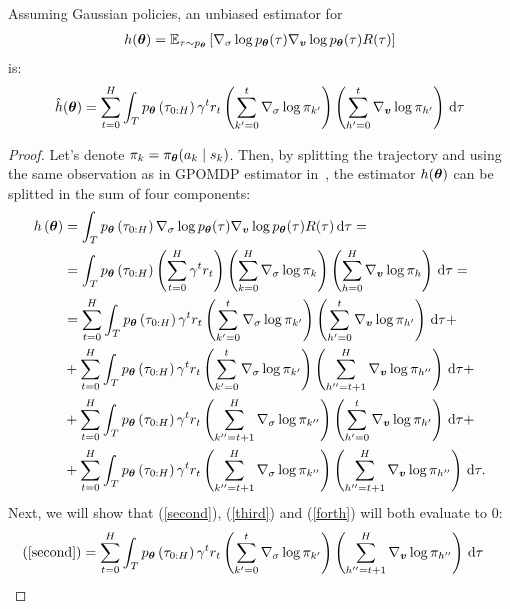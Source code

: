 \begin{theorem}
Assuming Gaussian policies, an unbiased estimator for 
\begin{align}
h(\vtheta) = \EV[\tau\sim p_{\vtheta}]{\score{\sigma}\score{\vv}R(\tau)}
\end{align}
is:
\begin{equation}
\hat{h}(\vtheta) =  \sum_{t=0}^{H}\int_{T}p_{\vtheta}\left(\tau_{0:H}\right)\gamma^{t}r_{t}\left(\gradlogsumpi{k'}{0}{t}{\sigma} \right)\left(\gradlogsumpi{h'}{0}{t}{\vv} \right)\de\tau
\end{equation}
\end{theorem}
\begin{proof}
Let's denote $\pi_k = \pi_{\vtheta}(a_k \mid s_k)$. Then, by splitting the trajectory and using the same observation as in GPOMDP estimator in~\cite{peters}, the estimator $h(\vtheta)$ can be splitted in the sum of four components:
\begin{align}
h\left({\vtheta}\right) &= \int_T p_{\vtheta}\left(\tau_{0:H}\right)\score[\vtheta]{\sigma} \score[\vtheta]{\vv}R(\tau)\de\tau \notag
= \\&=
\int_{T}p_{\vtheta}\left(\tau_{0:H}\right)\left(\sum_{t=0}^{H}\gamma^{t}r_t\right)\left(\gradlogsumpi{k}{0}{H}{\sigma}\right)\left(\gradlogsumpi{h}{0}{H}{\vv}\right) \de\tau \notag 
=\\&=
 \sum_{t=0}^{H}\int_{T}p_{\vtheta}\left(\tau_{0:H}\right)\gamma^{t}r_{t}\left(\gradlogsumpi{k'}{0}{t}{\sigma} \right)\left(\gradlogsumpi{h'}{0}{t}{\vv} \right)\de\tau  \label{first} 
+\\&+ 
\sum_{t=0}^{H}\int_{T}p_{\vtheta}\left(\tau_{0:H}\right)\gamma^{t}r_{t}\left(\gradlogsumpi{k'}{0}{t}{\sigma} \right)\left(\gradlogsumpi{h''}{t+1}{H}{\vv} \right)\de\tau  \label{second} 
+\\&+ 
\sum_{t=0}^{H}\int_{T}p_{\vtheta}\left(\tau_{0:H}\right)\gamma^{t}r_{t}\left(\gradlogsumpi{k''}{t+1}{H}{\sigma} \right)\left(\gradlogsumpi{h'}{0}{t}{\vv} \right)\de\tau  \label{third} 
+\\&+ 
\sum_{t=0}^{H}\int_{T}p_{\vtheta}\left(\tau_{0:H}\right)\gamma^{t}r_{t}\left(\gradlogsumpi{k''}{t+1}{H}{\sigma} \right)\left(\gradlogsumpi{h''}{t+1}{H}{\vv} \right)\de\tau.  \label{forth}
 \end{align}
Next, we will show that (\ref{second}), (\ref{third}) and (\ref{forth}) will both evaluate to $0$:
\allowdisplaybreaks
\begin{align*}
(\ref{second})
&=
\sum_{t=0}^{H}\int_{T}p_{\vtheta}\left(\tau_{0:H}\right)\gamma^{t}r_{t}\left(\gradlogsumpi{k'}{0}{t}{\sigma} \right)\left(\gradlogsumpi{h''}{t+1}{H}{\vv} \right)\de\tau 

\end{align*}
\end{proof}
